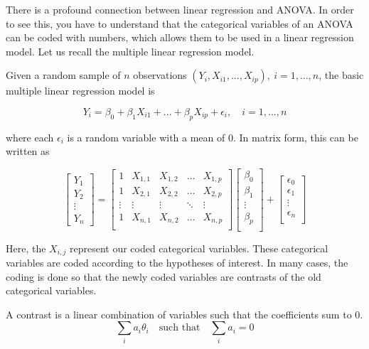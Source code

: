 \documentclass[
]{book}
\begin{document}
There is a profound connection between linear regression and ANOVA. In
order to see this, you have to understand that the categorical variables
of an ANOVA can be coded with numbers, which allows them to be used in a
linear regression model. Let us recall \autocite{LinearMod} the multiple linear
regression model.

Given a random sample of \(n\) observations
\((Y_{i}, X_{i1}, . . ., X_{ip}),\ i=1,...,n\), the basic multiple linear regression model is

\[
Y_{i}=\beta_0+\beta_1X_{i1}+...+\beta_pX_{ip}+\epsilon_i,\quad i=1,...,n
\]

where each \(\epsilon_i\) is a random variable with a mean of \(0\). In
matrix form, this can be written as

\[
\begin{bmatrix}
Y_1\\
Y_2\\
\vdots\\
Y_n
\end{bmatrix}
= 
\begin{bmatrix}
1 & X_{1,1} & X_{1,2} & \dots & X_{1, p}\\
1 & X_{2,1} & X_{2,2} & \dots & X_{2, p}\\
\vdots & \vdots & \vdots & \ddots & \vdots\\
1 & X_{n,1} & X_{n,2} & \dots & X_{n, p}\\
\end{bmatrix}
\begin{bmatrix}
\beta_0\\
\beta_1\\
\vdots\\
\beta_p\\
\end{bmatrix}
+
\begin{bmatrix}
\epsilon_0\\
\epsilon_1\\
\vdots\\
\epsilon_n\\
\end{bmatrix}
\]

Here, the \(X_{i,j}\) represent our coded categorical variables. These
categorical variables are coded according to the hypotheses of interest.
In many cases, the coding is done so that the newly coded variables are
contrasts of the old categorical variables.

A contrast is a linear combination of variables such that the
coefficients sum to 0.
\[\sum_i{a_i\theta_i}\quad\text{such that}\quad\sum_i{a_i}=0\]
\end{document}
